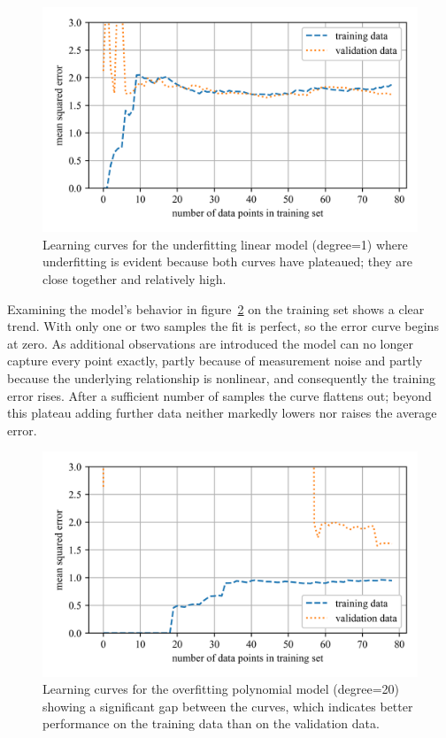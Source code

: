 \documentclass[12pt,letter]{article}
\begin{document}
\begin{figure}[H]
\centering
\includegraphics[]{../figures/overfitting_2.png}
\caption{Learning curves for the underfitting linear model (degree=1) where underfitting is evident because both curves have plateaued; they are close together and relatively high.}
\label{fig:overfitting_2}
\end{figure}

Examining the model's behavior in figure~\ref{fig:overfitting_3} on the training set shows a clear trend. With only one or two samples the fit is perfect, so the error curve begins at zero. As additional observations are introduced the model can no longer capture every point exactly, partly because of measurement noise and partly because the underlying relationship is nonlinear, and consequently the training error rises. After a sufficient number of samples the curve flattens out; beyond this plateau adding further data neither markedly lowers nor raises the average error.

\begin{figure}[H]
    \centering
    \includegraphics[]{../figures/overfitting_3.png}
    \caption{Learning curves for the overfitting polynomial model (degree=20) showing a significant gap between the curves, which indicates better performance on the training data than on the validation data.}
    \label{fig:overfitting_3}
\end{figure}
\end{document}
